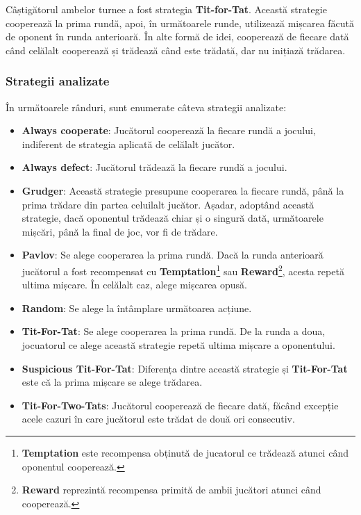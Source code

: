 Câștigătorul ambelor turnee a fost strategia \textbf{Tit-for-Tat}. Această strategie cooperează la prima rundă, apoi, în următoarele runde, utilizează mișcarea făcută de oponent în runda anterioară. În alte formă de idei, cooperează de fiecare dată când celălalt cooperează și trădează când este trădată, dar nu inițiază trădarea.

\clearpage

\subsubsection{Strategii analizate}

În următoarele rânduri, sunt enumerate câteva strategii analizate:

\begin{itemize}  
	\item \textbf{Always cooperate}: Jucătorul cooperează la fiecare rundă a jocului, indiferent de strategia aplicată de celălalt jucător. 
	\item \textbf{Always defect}: Jucătorul trădează la fiecare rundă a jocului. 
	\item \textbf{Grudger}: Această strategie presupune cooperarea la fiecare rundă, până la prima trădare din partea celuilalt jucător. Așadar, adoptând această strategie, dacă oponentul trădează chiar și o singură dată, următoarele mișcări, până la final de joc, vor fi de trădare. 
	\item \textbf{Pavlov}: Se alege cooperarea la prima rundă. Dacă la runda anterioară jucătorul a fost recompensat cu \textbf{Temptation}\footnote{\textbf{Temptation} este recompensa obținută de jucatorul ce trădează atunci când oponentul cooperează.} sau \textbf{Reward}\footnote{\textbf{Reward} reprezintă recompensa primită de ambii jucători atunci când cooperează.}, acesta repetă ultima mișcare. În celălalt caz, alege mișcarea opusă. 
	\item \textbf{Random}: Se alege la întâmplare următoarea acțiune. 
	\item \textbf{Tit-For-Tat}: Se alege cooperarea la prima rundă. De la runda a doua, jocuatorul ce alege această strategie repetă ultima mișcare a oponentului. 
	\item \textbf{Suspicious Tit-For-Tat}: Diferența dintre această strategie și \textbf{Tit-For-Tat} este că la prima mișcare se alege trădarea. 
	\item \textbf{Tit-For-Two-Tats}:  Jucătorul cooperează de fiecare dată, făcând excepție acele cazuri în care jucătorul este trădat de două ori consecutiv. 
\end{itemize}  


